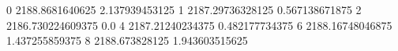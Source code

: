 0 2188.8681640625 2.137939453125
1 2187.29736328125 0.567138671875
2 2186.730224609375 0.0
4 2187.21240234375 0.482177734375
6 2188.16748046875 1.437255859375
8 2188.673828125 1.943603515625
